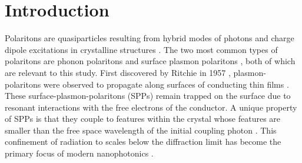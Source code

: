 \documentclass[
reprint,
amsmath,amssymb,
aip,
jap,
floatfix,
]{revtex4-2}
\begin{document}
  \section{Introduction}
  \label{sec:intro}
  	Polaritons are quasiparticles resulting from hybrid modes of photons and charge dipole excitations in crystalline structures \cite{Tolpygo:50}. The two most common types of polaritons are phonon polaritons \cite{Tolpygo:50, Huang:51, Huber:08} and surface plasmon polaritons \cite{Barnes:03}, both of which are relevant to this study. First discovered by Ritchie in 1957 \cite{Ritchie:57}, plasmon-polaritons were observed to propagate along surfaces of conducting thin films \cite{Pines:52}. These surface-plasmon-polaritons (SPPs) remain trapped on the surface due to resonant interactions with the free electrons of the conductor. A unique property of SPPs is that they couple to features within the crystal whose features are smaller than the free space wavelength of the initial coupling photon \cite{Pendry:99}. This confinement of radiation to scales below the diffraction limit has become the primary focus of modern nanophotonics \cite{Caldwell:14}.
\end{document}
